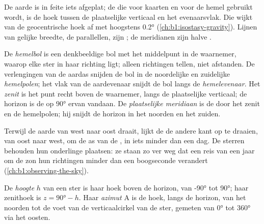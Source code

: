 De aarde is in feite iets afgeplat; de  die voor kaarten en voor de
hemel gebruikt wordt, is de hoek tussen de plaatselijke verticaal en het
evenaarsvlak. Die wijkt van de geocentrische hoek af met hoogstens \ang{0.2}
(\cref{ch:b1:isostasy-gravity}). Lijnen van gelijke breedte, de parallellen,
zijn ; de meridianen zijn halve .

\begin{definition}[De hemelbol]\label{def:b1:spherical-astronomy:celestial-sphere}
De \emph{hemelbol} is een denkbeeldige bol met het middelpunt
in de waarnemer, waarop elke ster in haar richting ligt; alleen richtingen
tellen, niet afstanden. De verlengingen van de aardas snijden de bol in de
noordelijke en zuidelijke \emph{hemelpolen}; het vlak van de
aardevenaar snijdt de bol langs de \emph{hemelevenaar}. Het
\emph{zenit} is het punt recht boven de waarnemer, langs de
plaatselijke verticaal; de horizon is de  op $\ang{90}$ ervan
vandaan. De \emph{plaatselijke meridiaan} is de
 door het zenit en de hemelpolen; hij snijdt de horizon in het
noorden en het zuiden.
\end{definition}

Terwijl de aarde van west naar oost draait, lijkt de  de andere kant op
te draaien, van oost naar west, om de as van de , in iets minder dan
een dag. De sterren behouden hun onderlinge plaatsen: ze staan zo ver weg dat
een reis van een jaar om de zon hun richtingen minder dan een boogseconde
verandert (\cref{ch:b1:observing-the-sky}).

\begin{definition}\label{def:b1:spherical-astronomy:horizontal}
De \emph{hoogte} $h$ van een ster is haar hoek boven
de horizon, van \ang{-90} tot \ang{90}; haar zenithoek is
$z = \ang{90} - h$. Haar \emph{azimut} $\mathrm{A}$ is de hoek,
langs de horizon, van het noorden tot de voet van de verticaalcirkel van de
ster, gemeten van \ang{0} tot \ang{360} via het oosten.
\end{definition}

